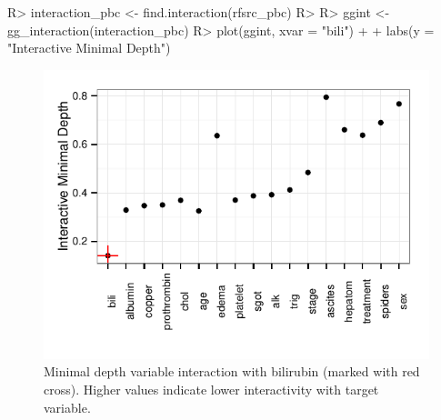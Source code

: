 \documentclass[nojss]{jss}\usepackage[]{graphicx}\usepackage[]{color}
\makeatletter
\def\maxwidth{ %
  \ifdim\Gin@nat@width>\linewidth
    \linewidth
  \else
    \Gin@nat@width
  \fi
}
\makeatother
\begin{document}
\begin{Schunk}
\begin{Sinput}
R> interaction_pbc <- find.interaction(rfsrc_pbc)
R> 
R> ggint <- gg_interaction(interaction_pbc)
R> plot(ggint, xvar = "bili") + 
+   labs(y = "Interactive Minimal Depth")
\end{Sinput}
\end{Schunk}

\begin{Schunk}
\begin{figure}[!htpb]

{\centering \includegraphics[width=\maxwidth]{figure/rfs-interaction-1} 

}

\caption[Minimal depth variable interaction with bilirubin (marked with red cross)]{Minimal depth variable interaction with bilirubin (marked with red cross). Higher values indicate lower interactivity with target variable.\label{fig:interaction}}
\end{figure}
\end{Schunk}
\end{document}
